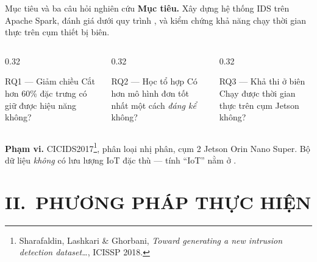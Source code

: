 \documentclass[aspectratio=169, 11pt]{beamer}
\begin{document}
\begin{frame}{Mục tiêu và ba câu hỏi nghiên cứu}
  \textbf{Mục tiêu.} Xây dựng hệ thống IDS trên Apache Spark, đánh giá dưới quy
  trình , và kiểm chứng khả năng chạy thời gian thực
  trên cụm thiết bị biên.
  \vspace{0.8em}
  \begin{columns}[T]
    \begin{column}{0.32\textwidth}
      \begin{block}{RQ1 --- Giảm chiều}
        \small Cắt hơn 60\% đặc trưng có giữ được hiệu năng không?
      \end{block}
    \end{column}
    \begin{column}{0.32\textwidth}
      \begin{block}{RQ2 --- Học tổ hợp}
        \small Có hơn mô hình đơn tốt nhất một cách \emph{đáng kể} không?
      \end{block}
    \end{column}
    \begin{column}{0.32\textwidth}
      \begin{block}{RQ3 --- Khả thi ở biên}
        \small Chạy được thời gian thực trên cụm Jetson không?
      \end{block}
    \end{column}
  \end{columns}
  \vfill
  \small
  \textbf{Phạm vi.} CICIDS2017\footnote{\tiny Sharafaldin, Lashkari \&
  Ghorbani, \emph{Toward generating a new intrusion detection dataset\ldots},
  ICISSP 2018.}, phân loại nhị phân, cụm 2 Jetson Orin Nano
  Super. Bộ dữ liệu \emph{không} có lưu lượng IoT đặc thù --- tính ``IoT'' nằm ở
  .
\end{frame}


\section{II.\ PHƯƠNG PHÁP THỰC HIỆN}
\end{document}
